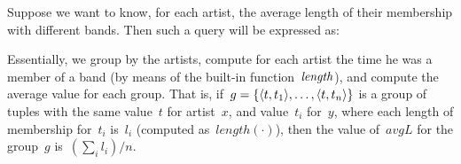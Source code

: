 \begin{example}
  \label{ex:AA}
  Suppose we want to know, for each artist, the average length of their membership with different bands. Then such a
  query will be expressed as:
  
  \nd Essentially, we group by the artists, compute for each artist the time he was a member of a band (by means of the
  built-in function~$\mathit{length}$), and compute the average value for each group.
  That is, if~$g = \{\langle t, t_{1} \rangle,\ldots, \langle t, t_{n} \rangle\}$ is a group of tuples with the same value~$t$ for
  artist~$x$, and value~$t_{i}$ for~$y$, where each length of membership for~$t_{i}$ is~$l_{i}$ (computed
  as~$length(\cdot)$), then the value of~$avgL$ for the group~$g$ is~$(\sum_{i} l_{i})/n$. 
\end{example}


